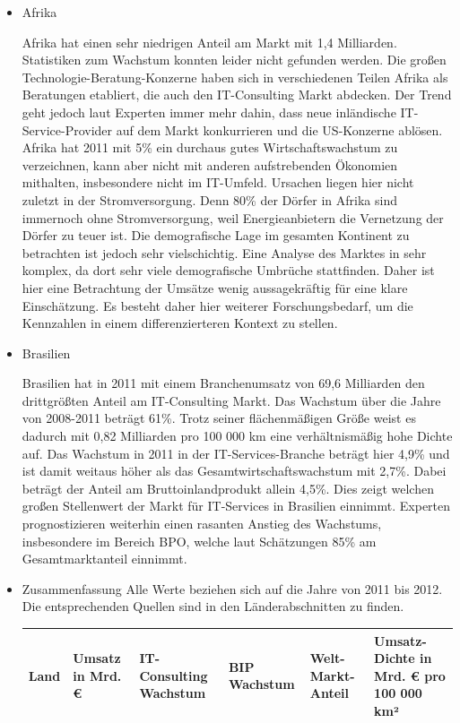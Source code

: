 \begin{itemize}
\item {Afrika}

Afrika hat einen sehr niedrigen Anteil am Markt mit 1,4 Milliarden. \cite{statAfr} Statistiken zum Wachstum konnten leider nicht gefunden werden. Die großen Technologie-Beratung-Konzerne haben sich in verschiedenen Teilen Afrika als Beratungen etabliert, die auch den IT-Consulting Markt abdecken. Der Trend geht jedoch laut Experten immer mehr dahin, dass neue inländische IT-Service-Provider auf dem Markt konkurrieren und die US-Konzerne ablösen. Afrika hat 2011 mit 5\% ein durchaus gutes Wirtschaftswachstum zu verzeichnen, kann aber nicht mit anderen aufstrebenden Ökonomien mithalten, insbesondere nicht im IT-Umfeld. \cite{statAfr2}
Ursachen liegen hier nicht zuletzt in der Stromversorgung. Denn 80\% der Dörfer in Afrika sind immernoch ohne Stromversorgung, weil Energieanbietern die Vernetzung der Dörfer zu teuer ist.  \cite{dieZeit}
Die demografische Lage im gesamten Kontinent zu betrachten ist jedoch sehr vielschichtig. Eine Analyse des Marktes in sehr komplex, da dort sehr viele demografische Umbrüche stattfinden. Daher ist hier eine Betrachtung der Umsätze wenig aussagekräftig für eine klare Einschätzung. Es besteht daher hier weiterer Forschungsbedarf, um die Kennzahlen in einem differenzierteren  Kontext zu stellen.


\item {Brasilien}

Brasilien hat in 2011 mit einem Branchenumsatz von 69,6 Milliarden den drittgrößten Anteil am IT-Consulting Markt. Das Wachstum über die Jahre von 2008-2011 beträgt 61\%. \cite{statBras2} Trotz seiner flächenmäßigen Größe weist es dadurch mit 0,82 Milliarden pro 100 000 km eine verhältnismäßig hohe Dichte auf. Das Wachstum in 2011 in der IT-Services-Branche beträgt hier 4,9\% und ist damit weitaus höher als das Gesamtwirtschaftswachstum mit 2,7\%. Dabei beträgt der Anteil am Bruttoinlandprodukt allein 4,5\%. Dies zeigt welchen großen Stellenwert der Markt für IT-Services in Brasilien einnimmt. Experten prognostizieren weiterhin einen rasanten Anstieg des Wachstums, insbesondere im Bereich BPO, welche laut Schätzungen 85\% am Gesamtmarktanteil einnimmt.\cite{statBras}

\item {Zusammenfassung}
Alle Werte beziehen sich auf die Jahre von 2011 bis 2012. Die entsprechenden Quellen sind in den Länderabschnitten zu finden.



\begin{tabular}{|p{2.6cm}|p{1.5cm}|p{2cm}|p{1.5cm}|p{1.5cm}|p{1.7cm}|}
 \hline
  \textbf{Land} & \textbf{Umsatz in Mrd. €} & \textbf{IT-Consulting Wachstum} & \textbf{BIP Wachstum} & \textbf{Welt-Markt-Anteil} & \textbf{Umsatz-Dichte in Mrd. € pro 100 000 km²} \\
  \hline
    

\end{tabular}
\end{itemize}
